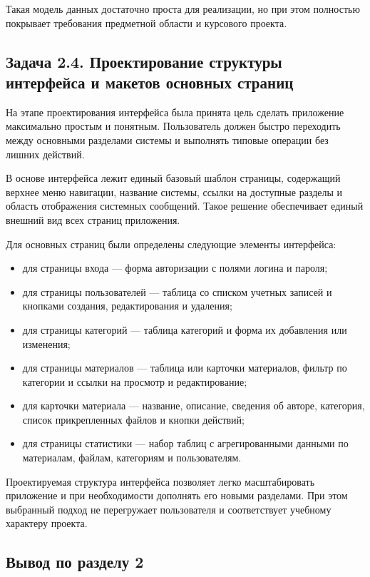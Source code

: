 \documentclass[14pt,a4paper]{extarticle}
\begin{document}
Такая модель данных достаточно проста для реализации, но при этом полностью покрывает требования предметной области и курсового проекта.

\subsection{Задача 2.4. Проектирование структуры интерфейса и макетов основных страниц}

На этапе проектирования интерфейса была принята цель сделать приложение максимально простым и понятным. Пользователь должен быстро переходить между основными разделами системы и выполнять типовые операции без лишних действий.

В основе интерфейса лежит единый базовый шаблон страницы, содержащий верхнее меню навигации, название системы, ссылки на доступные разделы и область отображения системных сообщений. Такое решение обеспечивает единый внешний вид всех страниц приложения.

Для основных страниц были определены следующие элементы интерфейса:

\begin{itemize}[leftmargin=1.25cm]
    \item для страницы входа --- форма авторизации с полями логина и пароля;
    \item для страницы пользователей --- таблица со списком учетных записей и кнопками создания, редактирования и удаления;
    \item для страницы категорий --- таблица категорий и форма их добавления или изменения;
    \item для страницы материалов --- таблица или карточки материалов, фильтр по категории и ссылки на просмотр и редактирование;
    \item для карточки материала --- название, описание, сведения об авторе, категория, список прикрепленных файлов и кнопки действий;
    \item для страницы статистики --- набор таблиц с агрегированными данными по материалам, файлам, категориям и пользователям.
\end{itemize}

Проектируемая структура интерфейса позволяет легко масштабировать приложение и при необходимости дополнять его новыми разделами. При этом выбранный подход не перегружает пользователя и соответствует учебному характеру проекта.

\subsection*{Вывод по разделу 2}
\end{document}
